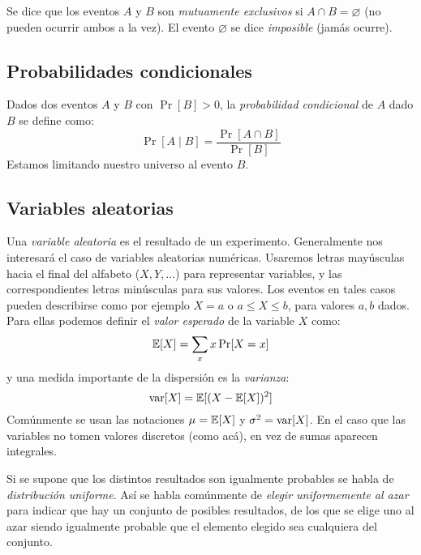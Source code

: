   Se dice que los eventos \(A\) y \(B\) son \emph{mutuamente exclusivos}
  si \(A \cap B = \varnothing\)
  (no pueden ocurrir ambos a la vez).
  El evento \(\varnothing\) se dice \emph{imposible}
  (jamás ocurre).

\subsection{Probabilidades condicionales}
\label{sec:probabilidades-condicionales}

  Dados dos eventos \(A\) y \(B\)
  con \(\Pr[B] > 0\),
  la \emph{probabilidad condicional} de \(A\) dado \(B\) se define como:
  \begin{equation}
    \label{eq:probabilidad-condicional}
    \Pr[A \mid B]
      = \frac{\Pr[A \cap B]}{\Pr[B]}
  \end{equation}
  Estamos limitando nuestro universo al evento \(B\).

\subsection{Variables aleatorias}
\label{sec:variable-aleatoria}

  Una \emph{variable aleatoria} es el resultado de un experimento.
  Generalmente nos interesará el caso de variables aleatorias numéricas.
  Usaremos letras mayúsculas hacia el final del alfabeto
  (\(X, Y, \dotsc\))
  para representar variables,
  y las correspondientes letras minúsculas para sus valores.
  Los eventos en tales casos pueden describirse como por ejemplo \(X = a\)
  o \(a \le X \le b\),
  para valores \(a, b\) dados.
  Para ellas podemos definir el \emph{valor esperado} de la variable \(X\)
  como:
  \begin{equation}
    \label{eq:E}
    \operatorname{\mathbb{E}}[X]
      = \sum_x x \Pr[X = x]
  \end{equation}
  y una medida importante de la dispersión es la \emph{varianza}:
  \begin{equation}
    \label{eq:var}
    \operatorname{var}[X]
      = \operatorname{\mathbb{E}}[(X - \operatorname{\mathbb{E}}[X])^2]
  \end{equation}
  Comúnmente se usan las notaciones \(\mu = \operatorname{\mathbb{E}}[X]\)
  y \(\sigma^2 = \operatorname{var}[X]\).
  En el caso que las variables no tomen valores discretos
  (como acá),
  en vez de sumas aparecen integrales.

  Si se supone que los distintos resultados son igualmente probables
  se habla de \emph{distribución uniforme}.
  Así se habla comúnmente de \emph{elegir uniformemente al azar}
  para indicar que hay un conjunto de posibles resultados,
  de los que se elige uno al azar
  siendo igualmente probable que el elemento elegido
  sea cualquiera del conjunto.

